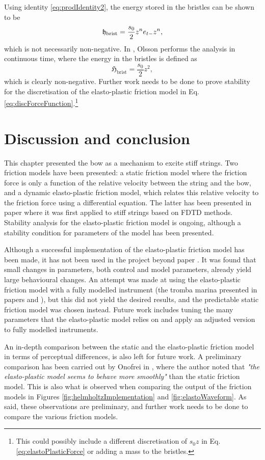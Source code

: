 Using identity \eqref{eq:prodIdentity2}, the energy stored in the bristles can be shown to be
\begin{equation}
    \mathfrak{h}_\text{brist} = \frac{s_0}{2}z^ne_{t-}z^n,
\end{equation}
which is not necessarily non-negative. In \cite{Olsson1996}, Olsson performs the analysis in continuous time, where the energy in the bristles is defined as 
\begin{equation}
    \mathfrak{H}_\text{brist} = \frac{s_0}{2} z^2,
\end{equation}
which is clearly non-negative. Further work needs to be done to prove stability for the discretisation of the elasto-plastic friction model in Eq. \eqref{eq:discForceFunction}.\footnote{This could possibly include a different discretisation of $s_0 z$ in Eq. \eqref{eq:elastoPlasticForce} or adding a mass to the bristles.}

\section{Discussion and conclusion}
This chapter presented the bow as a mechanism to excite stiff strings. Two friction models have been presented: a static friction model where the friction force is only a function of the relative velocity between the string and the bow, and a dynamic elasto-plastic friction model, which relates this relative velocity to the friction force using a differential equation. The latter has been presented in paper \citeP[C] where it was first applied to stiff strings based on FDTD methods. Stability analysis for the elasto-plastic friction model is ongoing,  although a stability condition for parameters of the model has been presented.

Although a successful implementation of the elasto-plastic friction model has been made, it has not been used in the project beyond paper \citeP[C]. It was found that small changes in parameters, both control and model parameters, already yield large behavioural changes. An attempt was made at using the elasto-plastic friction model with a fully modelled instrument (the tromba marina presented in papers \citeP[D] and \citeP[E]), but this did not yield the desired results, and the predictable static friction model was chosen instead. Future work includes tuning the many parameters that the elasto-plastic model relies on and apply an adjusted version to fully modelled instruments.

An in-depth comparison between the static and the elasto-plastic friction model in terms of perceptual differences, is also left for future work. A preliminary comparison has been carried out by Onofrei in \cite{Onofrei2021}, where the author noted that \textit{"the
elasto-plastic model seems to behave more smoothly"} than the static friction model. This is also what is observed when comparing the output of the friction models in Figures \ref{fig:helmholtzImplementation} and \ref{fig:elastoWaveform}. As said, these observations are preliminary, and further work needs to be done to compare the various friction models.

